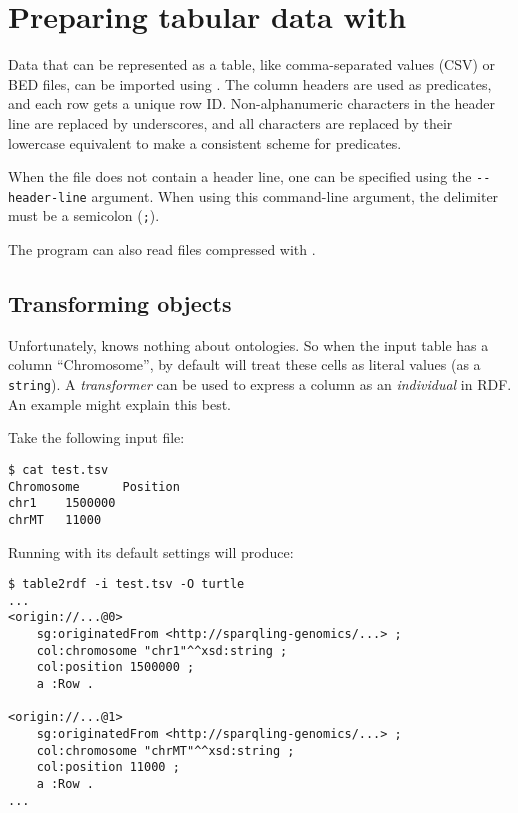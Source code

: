 \section{Preparing tabular data with }
\label{sec:table2rdf}

  Data that can be represented as a table, like comma-separated values (CSV)
  or BED files, can be imported using .  The column headers
  are used as predicates, and each row gets a unique row ID.  Non-alphanumeric
  characters in the header line are replaced by underscores, and all characters
  are replaced by their lowercase equivalent to make a consistent scheme for
  predicates.

  When the file does not contain a header line, one can be specified using the
  \texttt{-{}-header-line} argument.  When using this command-line argument, the
  delimiter must be a semicolon (\texttt{;}).

  The program can also read files compressed with .

\subsection{Transforming objects}

  Unfortunately,  knows nothing about ontologies.  So when
  the input table has a column ``Chromosome'', by default 
  will treat these cells as literal values (as a \texttt{string}).  A
  \emph{transformer} can be used to express a column as an \emph{individual} in
  RDF.  An example might explain this best.

  Take the following input file:
\begin{siderules}
\begin{verbatim}
$ cat test.tsv
Chromosome      Position
chr1    1500000
chrMT   11000
\end{verbatim}
\end{siderules}

  Running  with its default settings will produce:

\begin{siderules}
\begin{verbatim}
$ table2rdf -i test.tsv -O turtle
...
<origin://...@0>
    sg:originatedFrom <http://sparqling-genomics/...> ;
    col:chromosome "chr1"^^xsd:string ;
    col:position 1500000 ;
    a :Row .

<origin://...@1>
    sg:originatedFrom <http://sparqling-genomics/...> ;
    col:chromosome "chrMT"^^xsd:string ;
    col:position 11000 ;
    a :Row .
...
\end{verbatim}
\end{siderules}

